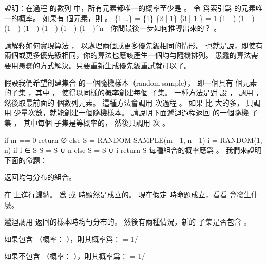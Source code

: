 \startEXERCISE \DIFFICULT
證明：在過程  的數列  中，所有元素都唯一的概率至少是 。
\stopEXERCISE
\startANSWER
令  爲索引爲  的元素唯一的概率。
如果有  個元素，則 。
\startformula\startmathalignment
\NC \Pr\{1   \cap \ldots\}
       \NC= \Pr\{1\} \cdot \Pr\{2 | 1\} \cdot \Pr\{3 | 1 \} \cdots \NR
\NC    \NC= 1 (1 - )
            (1 - )
            (1 - )
            \cdots \NR
\NC    \NC{} (1 - )
            (1 - )
            (1 - )
            \cdots \NR
\NC    \NC\ge (1 - )^n \NR
\NC    \NC{} -  \NR
\stopmathalignment\stopformula
你問最後一步如何推導出來的？ 。
\stopANSWER

\startEXERCISE
請解釋如何實現算法 ，
以處理兩個或更多優先級相同的情形。
也就是說，即使有兩個或更多優先級相同，你的算法也應該產生一個均勻隨機排列。
\stopEXERCISE
\startANSWER
愚蠢的算法需要用愚蠢的方式解決。只要重新生成優先級重試就可以了。
\stopANSWER

\startEXERCISE
假設我們希望創建集合  的一個{\EMP 隨機樣本（random sample）}，
即一個具有  個元素的子集 ，其中 ，
使得以同樣的概率創建每個  子集。
一種方法是對  設 ，
調用 ，
然後取最前面的  個數列元素。
這種方法會調用  次過程 。
如果  比  大的多，
只調用  少量次數，就能創建一個隨機樣本。
請說明下面遞迴過程返回  的一個隨機  子集 ，
其中每個  子集是等概率的，
然後只調用  次 。

\startCLRS
if m == 0
	return ∅
else S = RANDOM-SAMPLE(m - 1, n - 1)
	i = RANDOM(1, n)
	if i ∈ S
		S = S ∪ {n}
	else S = S ∪ {i}
	return S
\stopCLRS
\stopEXERCISE
\startANSWER
每種組合的概率應爲 。
我們來證明下面的命題：

 返回均勻分布的組合。

在  上進行歸納。  爲  或  時顯然是成立的。
現在假定  時命題成立，看看  會發生什麼。

遞迴調用  返回的樣本時均勻分布的。
然後有兩種情況，新的  子集是否包含 。

如果包含  （概率： ），則其概率爲：
\startformula
{} = 1/
\stopformula

如果不包含  （概率： ），則其概率爲：
\startformula
{} = 1/
\stopformula
\stopANSWER

\stopsection
